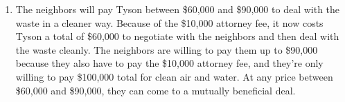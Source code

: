 \documentclass{article}
\begin{document}
\begin{enumerate}
\begin{enumerate}
	\item The neighbors will pay Tyson between \$60,000 and \$90,000 to deal with the waste in a cleaner way. Because of the \$10,000 attorney fee, it now costs Tyson a total of \$60,000 to negotiate with the neighbors and then deal with the waste cleanly. The neighbors are willing to pay them up to \$90,000 because they also have to pay the \$10,000 attorney fee, and they're only willing to pay \$100,000 total for clean air and water. At any price between \$60,000 and \$90,000, they can come to a mutually beneficial deal. 
	
	\end{enumerate}

\end{enumerate}
\end{document}
